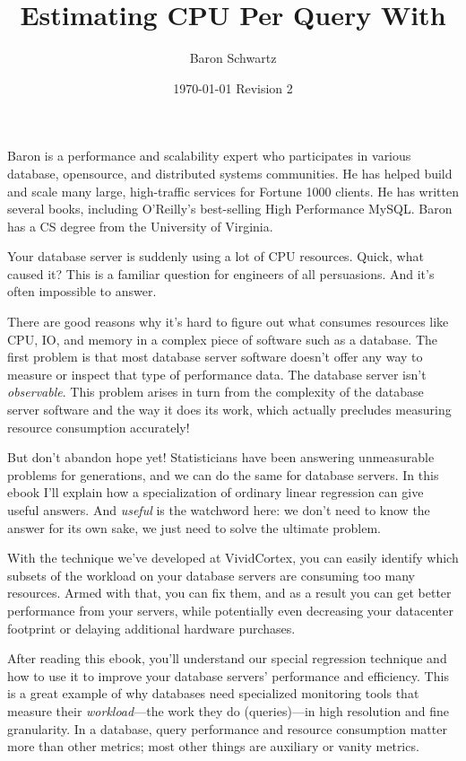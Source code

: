 \documentclass{vivid_layout}
\title{Estimating CPU Per Query With}{\fontsize{27pt}{15pt}\selectfont Weighted Linear Regression}
\date{\color{white} \today{} \textbullet{} Revision 2}
\author{Baron Schwartz}{img/baron}
\begin{document}
\maketitle		%
\begin{bio}		%
Baron is a performance and scalability expert who participates in various
database, opensource, and distributed systems communities. He has helped build
and scale many large, high-traffic services for Fortune 1000 clients. He has
written several books, including O'Reilly's best-selling High Performance MySQL.
Baron has a CS degree from the University of Virginia.
\end{bio}
\tableofcontents	%

Your database server is suddenly using a lot of CPU resources. Quick, what caused it? This is a familiar question for engineers of all persuasions. And it's often impossible to answer.

There are good reasons why it's hard to figure out what consumes resources like CPU, IO, and memory in a complex piece of software such as a database. The first problem is that most database server software doesn't offer any way to measure or inspect that type of performance data. The database server isn't \emph{observable}. This problem arises in turn from the complexity of the database server software and the way it does its work, which actually precludes measuring resource consumption accurately!

But don't abandon hope yet! Statisticians have been answering unmeasurable problems for generations, and we can do the same for database servers. In this ebook I'll explain how a specialization of ordinary linear regression can give useful answers. And \emph{useful} is the watchword here: we don't need to know the answer for its own sake, we just need to solve the ultimate problem.

With the technique we've developed at VividCortex, you can easily identify which subsets of the workload on your database servers are consuming too many resources. Armed with that, you can fix them, and as a result you can get better performance from your servers, while potentially even decreasing your datacenter footprint or delaying additional hardware purchases.

After reading this ebook, you'll understand our special regression technique and how to use it to improve your database servers' performance and efficiency. This is a great example of why databases need specialized monitoring tools that measure their \emph{workload}---the work they do (queries)---in high resolution and fine granularity. In a database, query performance and resource consumption matter more than other metrics; most other things are auxiliary or vanity metrics.
\end{document}

